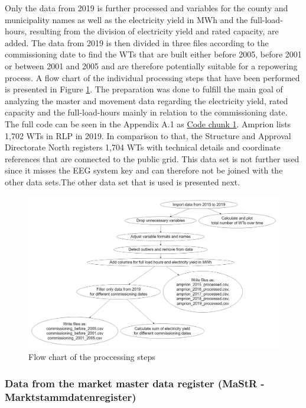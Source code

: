 \documentclass[a4paper,11pt]{article}
\begin{document}
Only the data from 2019 is further processed and variables for the county and municipality names as well as the electricity yield in MWh and the full-load-hours, resulting from the division of electricity yield and rated capacity, are added. The data from 2019 is then divided in three files according to the commissioning date to find the WTs that are built either before 2005, before 2001 or between 2001 and 2005 and are therefore potentially suitable for a repowering process. A flow chart of the individual processing steps that have been performed is presented in Figure \ref{fig:preparation}. The preparation was done to fulfill the main goal of analyzing the master and movement data regarding the electricity yield, rated capacity and the full-load-hours mainly in relation to the commissioning date. The full code can be seen in the Appendix A.1 as \protect\hyperlink{code-chunk-1}{Code chunk 1}. Amprion lists 1,702 WTs in RLP in 2019. In comparison to that, the Structure and Approval Directorate North registers 1,704 WTs with technical details and coordinate references that are connected to the public grid. This data set is not further used since it misses the EEG system key and can therefore not be joined with the other data sets.The other data set that is used is presented next.
\begin{figure}

{\centering \includegraphics[width=1\linewidth]{data/Amprion/results_of_preparation/prepflow} 

}

\caption{Flow chart of the proccessing steps}\label{fig:preparation}
\end{figure}
\hypertarget{data-from-the-market-master-data-register-mastr---marktstammdatenregister}{%
\subsubsection{Data from the market master data register (MaStR - Marktstammdatenregister)}\label{data-from-the-market-master-data-register-mastr---marktstammdatenregister}}
\end{document}
